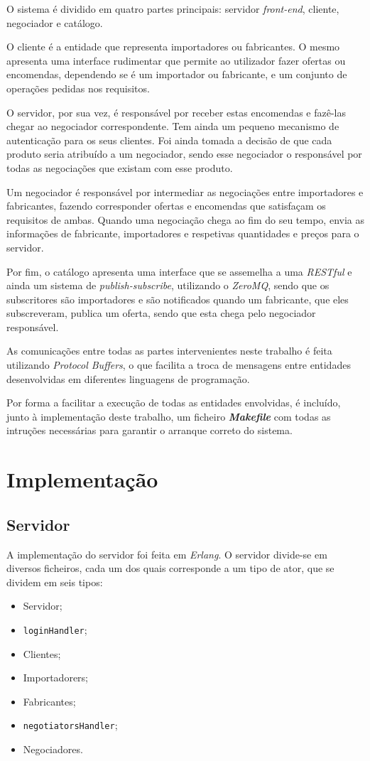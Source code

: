 \documentclass[a4paper]{report}
\begin{document}
	O sistema é dividido em quatro partes principais: servidor \textit{front-end}, cliente, negociador e catálogo.

	O cliente é a entidade que representa importadores ou fabricantes. 
	O mesmo apresenta uma interface rudimentar que permite ao utilizador fazer ofertas ou encomendas, dependendo se é um importador ou fabricante, e um conjunto de operações pedidas nos requisitos.
	
	O servidor, por sua vez, é responsável por receber estas encomendas e fazê-las chegar ao negociador correspondente. Tem ainda um pequeno mecanismo de autenticação para os seus clientes.
	Foi ainda tomada a decisão de que cada produto seria atribuído a um negociador, sendo esse negociador o responsável por todas as negociações que existam com esse produto.
	
	Um negociador é responsável por intermediar as negociações entre importadores e fabricantes, fazendo corresponder ofertas e encomendas que satisfaçam os requisitos de ambas.
	Quando uma negociação chega ao fim do seu tempo, envia as informações de fabricante, importadores e respetivas quantidades e preços para o servidor.

	Por fim, o catálogo apresenta uma interface que se assemelha a uma \textit{RESTful} e ainda um sistema de \textit{publish-subscribe}, utilizando o \textit{ZeroMQ}, sendo que os subscritores são importadores e são notificados quando um fabricante, que eles subscreveram, publica um oferta, sendo que esta chega pelo negociador responsável.
	
	As comunicações entre todas as partes intervenientes neste trabalho é feita utilizando \textit{Protocol Buffers}, o que facilita a troca de mensagens entre entidades desenvolvidas em diferentes linguagens de programação.

	Por forma a facilitar a execução de todas as entidades envolvidas, é incluído, junto à implementação deste trabalho, um ficheiro \textbf{\textit{Makefile}} com todas as intruções necessárias para garantir o arranque correto do sistema.

	\section{Implementação}
	
	\subsection{Servidor}
	A implementação do servidor foi feita em \textit{Erlang}. O servidor divide-se em diversos ficheiros, cada um dos quais corresponde a um tipo de ator, que se dividem em seis tipos:
	\begin{itemize}
		\item Servidor;
		\item \texttt{loginHandler};
		\item Clientes;
		\item Importadorers;
		\item Fabricantes;
		\item \texttt{negotiatorsHandler};
		\item Negociadores.
	\end{itemize}
\end{document}
